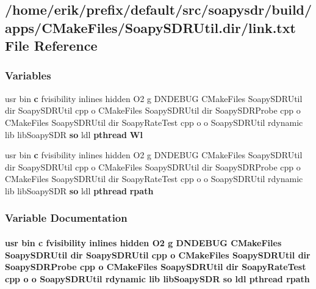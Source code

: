 \subsection{/home/erik/prefix/default/src/soapysdr/build/apps/\+C\+Make\+Files/\+Soapy\+S\+D\+R\+Util.dir/link.txt File Reference}
\label{soapysdr_2build_2apps_2CMakeFiles_2SoapySDRUtil_8dir_2link_8txt}
\subsubsection*{Variables}
\begin{DoxyCompactItemize}
\item 
usr bin {\bf c} fvisibility inlines hidden O2 g D\+N\+D\+E\+B\+UG C\+Make\+Files Soapy\+S\+D\+R\+Util dir Soapy\+S\+D\+R\+Util cpp o C\+Make\+Files Soapy\+S\+D\+R\+Util dir Soapy\+S\+D\+R\+Probe cpp o C\+Make\+Files Soapy\+S\+D\+R\+Util dir Soapy\+Rate\+Test cpp o o Soapy\+S\+D\+R\+Util rdynamic lib lib\+Soapy\+S\+DR {\bf so} ldl {\bf pthread} {\bf Wl}
\item 
usr bin {\bf c} fvisibility inlines hidden O2 g D\+N\+D\+E\+B\+UG C\+Make\+Files Soapy\+S\+D\+R\+Util dir Soapy\+S\+D\+R\+Util cpp o C\+Make\+Files Soapy\+S\+D\+R\+Util dir Soapy\+S\+D\+R\+Probe cpp o C\+Make\+Files Soapy\+S\+D\+R\+Util dir Soapy\+Rate\+Test cpp o o Soapy\+S\+D\+R\+Util rdynamic lib lib\+Soapy\+S\+DR {\bf so} ldl {\bf pthread} {\bf rpath}
\end{DoxyCompactItemize}


\subsubsection{Variable Documentation}
\paragraph[{rpath}]{\setlength{\rightskip}{0pt plus 5cm}usr bin {\bf c} fvisibility inlines hidden O2 g D\+N\+D\+E\+B\+UG C\+Make\+Files Soapy\+S\+D\+R\+Util dir Soapy\+S\+D\+R\+Util cpp o C\+Make\+Files Soapy\+S\+D\+R\+Util dir Soapy\+S\+D\+R\+Probe cpp o C\+Make\+Files Soapy\+S\+D\+R\+Util dir Soapy\+Rate\+Test cpp o o Soapy\+S\+D\+R\+Util rdynamic lib lib\+Soapy\+S\+DR {\bf so} ldl {\bf pthread} rpath}\label{soapysdr_2build_2apps_2CMakeFiles_2SoapySDRUtil_8dir_2link_8txt_aaf7c563125b8abde1358075c7ed8fafa}


